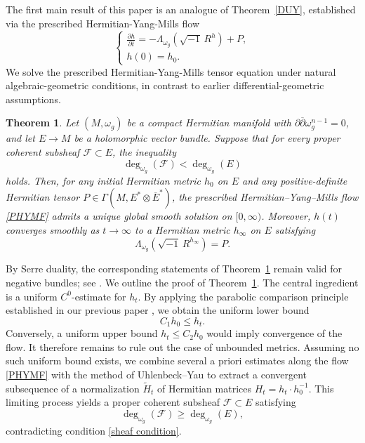 \documentclass[12pt, reqno]{amsart}
\theoremstyle{plain}
\newtheorem{thm}{Theorem}[section]
\theoremstyle{definition}
\newcommand{\btheorem}{\begin{thm}}
\newcommand{\etheorem}{\end{thm}}
\renewcommand{\bar}{\overline}
\renewcommand{\tilde}{\widetilde}
\renewcommand{\>}{\rightarrow}
\renewcommand{\>}{\rightarrow}
\renewcommand{\bar}{\overline}
\renewcommand{\tilde}{\widetilde}
\numberwithin{equation}{section} %
\begin{document}
 \baselineskip

The first main result of this paper is an analogue of Theorem~\ref{DUY},
established via the prescribed Hermitian-Yang-Mills flow
\begin{equation}
\label{PHYMF}
\begin{cases}
\displaystyle \frac{\partial h}{\partial t}
= -\Lambda_{\omega_g}\!\left(\sqrt{-1}\, R^h\right) + P, \\[10pt]
h(0) = h_0.
\end{cases}
\end{equation}
We solve the prescribed Hermitian-Yang-Mills tensor equation under natural algebraic-geometric conditions, in contrast to earlier differential-geometric assumptions.
\btheorem \label{main}
Let $(M,\omega_g)$ be a compact Hermitian manifold with
$\partial\bar{\partial}\omega_g^{n-1}=0$,
and let $E\to M$ be a holomorphic vector bundle. Suppose that for every  proper coherent subsheaf
$\mathcal{F}\subset E$, the inequality
\begin{equation}
\label{sheaf condition}
\deg_{\omega_g}(\mathcal{F}) < \deg_{\omega_g}(E)
\end{equation}
holds. Then, for any initial Hermitian metric $h_0$ on $E$
and any positive-definite Hermitian tensor
$P\in\Gamma(M,E^*\otimes\overline{E}^*)$,
the prescribed Hermitian–Yang–Mills flow \eqref{PHYMF}
admits a unique global smooth solution on $[0,\infty)$.
Moreover, $h(t)$ converges smoothly as $t\to\infty$
to a Hermitian metric $h_\infty$ on $E$ satisfying
\begin{equation}
\Lambda_{\omega_g}\left(\sqrt{-1}\,R^{h_\infty}\right)=P.
\end{equation}
\etheorem

\noindent By Serre duality, the corresponding statements of Theorem~\ref{main} remain valid for negative bundles; see \cite{WYY26+}.  We  outline the proof of Theorem~\ref{main}. The central ingredient is a uniform $C^0$-estimate for $h_t$. By applying the parabolic comparison principle established in our previous paper \cite{XYY26+}, we obtain the uniform lower bound
\[
C_1 h_0 \leq h_t.
\]
Conversely, a uniform upper bound $h_t \leq C_2 h_0$ would imply convergence of the flow.  It therefore remains to rule out the case of unbounded metrics. Assuming no such uniform bound exists, we combine several a priori estimates along the flow \eqref{PHYMF} with the method of Uhlenbeck--Yau to extract a convergent subsequence of a normalization $\tilde H_t$ of Hermitian matrices $H_t = h_t \cdot h_0^{-1}$. This limiting process yields a proper coherent subsheaf $\mathcal{F} \subset E$ satisfying
$$
\deg_{\omega_g}(\mathcal{F})\geq \deg_{\omega_g}(E),
$$
contradicting condition \eqref{sheaf condition}.\\
\end{document}
